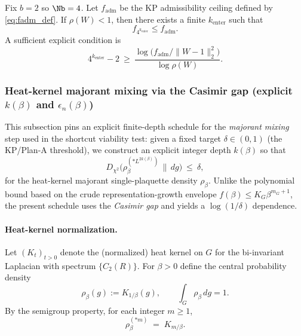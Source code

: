 \begin{corollary}[Finite-depth deterministic entry for $b=2$]\label{cor:det_entry_b2}
Fix $b=2$ so $\Nb=4$.
Let $f_{\mathrm{adm}}$ be the KP admissibility ceiling defined by \eqref{eq:fadm_def}.
If $\rho(W)<1$, then there exists a finite $k_{\mathrm{enter}}$ such that
\[
f_{4^{k_{\mathrm{enter}}}}\le f_{\mathrm{adm}}.
\]
A sufficient explicit condition is
\begin{equation}\label{eq:k_enter_condition}
4^{k_{\mathrm{enter}}}-2\ \ge\
\frac{\log\!\bigl(f_{\mathrm{adm}}/\|W-1\|_2^2\bigr)}{\log\rho(W)}.
\end{equation}
\end{corollary}

\subsubsection{Heat-kernel majorant mixing via the Casimir gap (explicit \texorpdfstring{$k(\beta)$}{k(beta)} and \texorpdfstring{$\epsilon_n(\beta)$}{epsilon\_n(beta)})}\label{subsec:hardened50_casimir_gap_mixing}

This subsection pins an explicit finite-depth schedule for the \emph{majorant mixing} step used in the shortcut viability test:
given a fixed target $\delta\in(0,1)$ (the KP/Plan-A threshold), we construct an explicit integer depth $k(\beta)$ so that
\[
D_{\chi^2}\!\bigl(\rho_\beta^{(*L^{2k(\beta)})}\,\|\,dg\bigr)\ \le\ \delta,
\]
for the heat-kernel majorant single-plaquette density $\rho_\beta$.
Unlike the polynomial bound based on the crude representation-growth envelope $f(\beta)\le K_G\beta^{m_G+1}$,
the present schedule uses the \emph{Casimir gap} and yields a $\log(1/\delta)$ dependence.

\paragraph{Heat-kernel normalization.}
Let $(K_t)_{t>0}$ denote the (normalized) heat kernel on $G$ for the bi-invariant Laplacian with spectrum $\{C_2(R)\}$.
For $\beta>0$ define the central probability density
\begin{equation}\label{eq:h50_rho_beta_def}
\rho_\beta(g):=K_{1/\beta}(g),\qquad \int_G \rho_\beta\,dg=1.
\end{equation}
By the semigroup property, for each integer $m\ge 1$,
\begin{equation}\label{eq:h50_conv_power_semigroup}
\rho_\beta^{(*m)} \;=\; K_{m/\beta}.
\end{equation}

